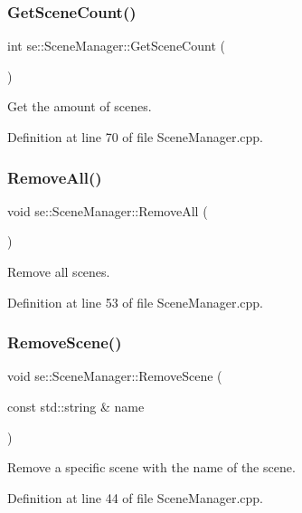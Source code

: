 \subsubsection{\texorpdfstring{Get\+Scene\+Count()}{GetSceneCount()}}
{\footnotesize\ttfamily int se\+::\+Scene\+Manager\+::\+Get\+Scene\+Count (\begin{DoxyParamCaption}{ }\end{DoxyParamCaption})}

Get the amount of scenes. 

Definition at line 70 of file Scene\+Manager.\+cpp.

\mbox{\label{classse_1_1_scene_manager_a354707c12a744c1f86e9433b312f8203}} 
\subsubsection{\texorpdfstring{Remove\+All()}{RemoveAll()}}
{\footnotesize\ttfamily void se\+::\+Scene\+Manager\+::\+Remove\+All (\begin{DoxyParamCaption}{ }\end{DoxyParamCaption})}

Remove all scenes. 

Definition at line 53 of file Scene\+Manager.\+cpp.

\mbox{\label{classse_1_1_scene_manager_a7912dae18fcbfff00194a63b88aec179}} 
\subsubsection{\texorpdfstring{Remove\+Scene()}{RemoveScene()}}
{\footnotesize\ttfamily void se\+::\+Scene\+Manager\+::\+Remove\+Scene (\begin{DoxyParamCaption}\item[{const std\+::string \&}]{name }\end{DoxyParamCaption})}

Remove a specific scene with the name of the scene. 

Definition at line 44 of file Scene\+Manager.\+cpp.

